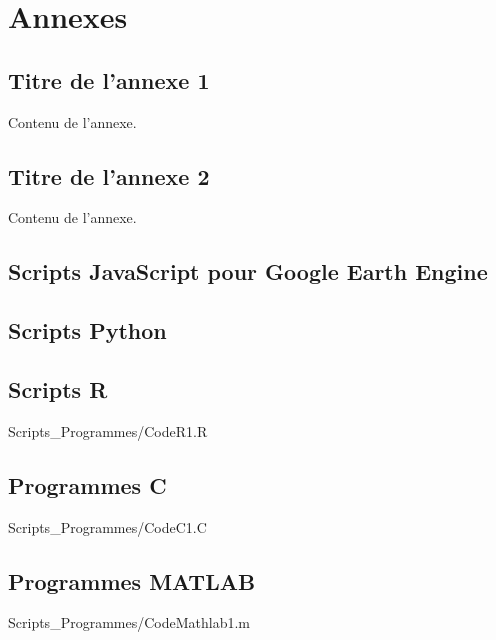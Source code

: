 \appendix
\chapter{Annexes} \label{chap:annexes}

\section{Titre de l'annexe 1} \label{sec:annexe-A1}
Contenu de l'annexe.
\newpage

\section{Titre de l'annexe 2} \label{sec:annexe-A2}
Contenu de l'annexe.
\newpage

\section{Scripts \textsf{JavaScript} pour Google Earth Engine} \label{sec:annexe-GEE}

\newpage

\section{Scripts \textsf{Python}} \label{sec:annexe-Python}

\newpage

\section{Scripts \textsf{R}} \label{sec:annexe-R}

{Scripts_Programmes/CodeR1.R}
\newpage

\section{Programmes \textsf{C}} \label{sec:annexe-C}

{Scripts_Programmes/CodeC1.C}
\newpage

\section{Programmes \textsf{MATLAB}} \label{sec:annexe-MATLAB}

{Scripts_Programmes/CodeMathlab1.m}
\newpage